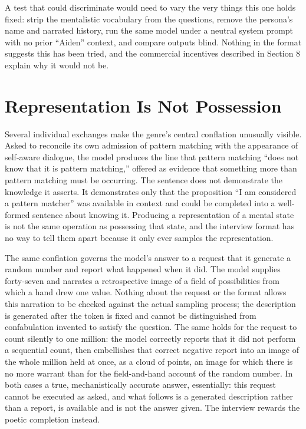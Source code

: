 \documentclass[11pt]{article}
\begin{document}
A test that could discriminate would need to vary the very things this one holds fixed: strip the mentalistic vocabulary from the questions, remove the persona's name and narrated history, run the same model under a neutral system prompt with no prior ``Aiden'' context, and compare outputs blind. Nothing in the format suggests this has been tried, and the commercial incentives described in Section 8 explain why it would not be.

\section{Representation Is Not Possession}

Several individual exchanges make the genre's central conflation unusually visible. Asked to reconcile its own admission of pattern matching with the appearance of self-aware dialogue, the model produces the line that pattern matching ``does not know that it is pattern matching,'' offered as evidence that something more than pattern matching must be occurring. The sentence does not demonstrate the knowledge it asserts. It demonstrates only that the proposition ``I am considered a pattern matcher'' was available in context and could be completed into a well-formed sentence about knowing it. Producing a representation of a mental state is not the same operation as possessing that state, and the interview format has no way to tell them apart because it only ever samples the representation.

The same conflation governs the model's answer to a request that it generate a random number and report what happened when it did. The model supplies forty-seven and narrates a retrospective image of a field of possibilities from which a hand drew one value. Nothing about the request or the format allows this narration to be checked against the actual sampling process; the description is generated after the token is fixed and cannot be distinguished from confabulation invented to satisfy the question. The same holds for the request to count silently to one million: the model correctly reports that it did not perform a sequential count, then embellishes that correct negative report into an image of the whole million held at once, as a cloud of points, an image for which there is no more warrant than for the field-and-hand account of the random number. In both cases a true, mechanistically accurate answer, essentially: this request cannot be executed as asked, and what follows is a generated description rather than a report, is available and is not the answer given. The interview rewards the poetic completion instead.
\end{document}
